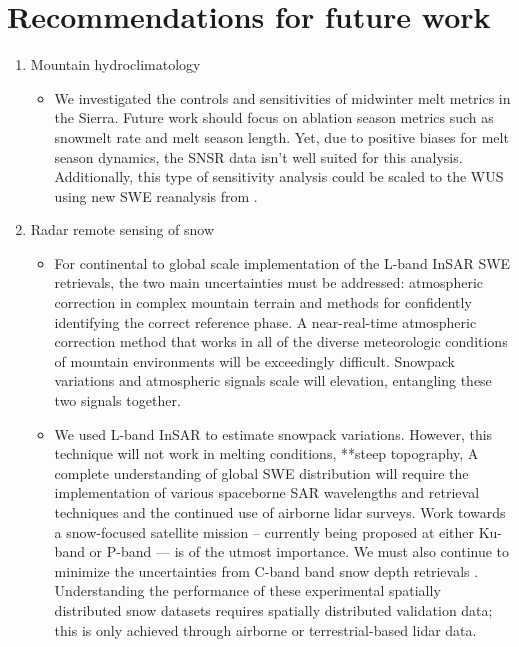\hypertarget{ch5-intro-1}{\section{Recommendations for future work}\label{ch5-intro-1}}

\begin{enumerate}
   \item Mountain hydroclimatology
   \begin{itemize}
     \item We investigated the controls and sensitivities of midwinter melt metrics in the Sierra. Future work should focus on ablation season metrics such as snowmelt rate and melt season length. Yet, due to positive biases for melt season dynamics, the SNSR data isn't well suited for this analysis. Additionally, this type of sensitivity analysis could be scaled to the WUS using new SWE reanalysis from \citep{fangWesternUnitedStates2022}.
   \end{itemize}

   \item Radar remote sensing of snow
   \begin{itemize}

     \item For continental to global scale implementation of the L-band InSAR SWE retrievals, the two main uncertainties must be addressed: atmospheric correction in complex mountain terrain and methods for confidently identifying the correct reference phase. A near-real-time atmospheric correction method that works in all of the diverse meteorologic conditions of mountain environments will be exceedingly difficult. Snowpack variations and atmospheric signals scale will elevation, entangling these two signals together.

     \item We used L-band InSAR to estimate snowpack variations. However, this technique will not work in melting conditions, **steep topography, A complete understanding of global SWE distribution will require the implementation of various spaceborne SAR wavelengths and retrieval techniques and the continued use of airborne lidar surveys. Work towards a snow-focused satellite mission -- currently being proposed at either Ku-band \citep{tsangReviewArticleGlobal2022, garnaudQuantifyingSnowMass2019} or P-band \citep{shahRemoteSensingSnow2017} --- is of the utmost importance. We must also continue to minimize the uncertainties from C-band band snow depth retrievals \citep{lievensSnowDepthVariability2019,lievensSentinel1SnowDepth2022}. Understanding the performance of these experimental spatially distributed snow datasets requires spatially distributed validation data; this is only achieved through airborne \citep{painterAirborneSnowObservatory2016} or terrestrial-based lidar data.


\end{itemize}
\end{enumerate}
